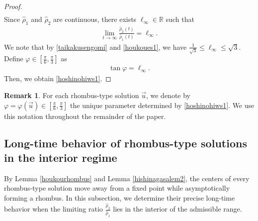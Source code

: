 \documentclass[reqno]{amsart}
\theoremstyle{plain}
\theoremstyle{definition}
\newtheorem{remark}{Remark}[section]
\numberwithin{equation}{section}
\begin{document}
\begin{proof}
\begin{align*}
\end{align*}
Since $\hat{\rho}_1$ and $\hat{\rho}_2$ are continuous, there exists $\ell_{\infty}\in \mathbb{R}$ such that 
\begin{align}
\lim_{t\to\infty}\frac{\hat{\rho}_2(t)}{\hat{\rho}_1(t)}=\ell_{\infty}.
\end{align}
We note that by \eqref{taikakusengomi} and \eqref{houkoues1}, we have $\frac{1}{\sqrt{3}}\leq \ell_{\infty}\leq \sqrt{3}$. Define $\varphi\in[\frac{\pi}{6},\frac{\pi}{3}]$ as
\begin{align*}
\tan{\varphi}=\ell_{\infty}.
\end{align*}
Then, we obtain \eqref{hoshinohiws1}.
\end{proof}

\begin{remark}
For each rhombus-type solution $\vec{u}$, we denote by $\varphi=\varphi(\vec{u})\in[\frac{\pi}{6},\frac{\pi}{3}]$
the unique parameter determined by \eqref{hoshinohiws1}. We use this notation throughout the remainder of the paper.
\end{remark}

\subsection{Long-time behavior of rhombus-type solutions in the interior regime}

By Lemma \ref{houkourhombus} and Lemma \ref{hishinagasalem2}, the centers of every rhombus-type solution move away from a fixed point while asymptotically forming a rhombus. In this subsection, we determine their precise long-time behavior when the limiting ratio $\frac{\hat{\rho}_2}{\hat{\rho}_1}$ lies in the interior of the admissible range.
\end{document}
